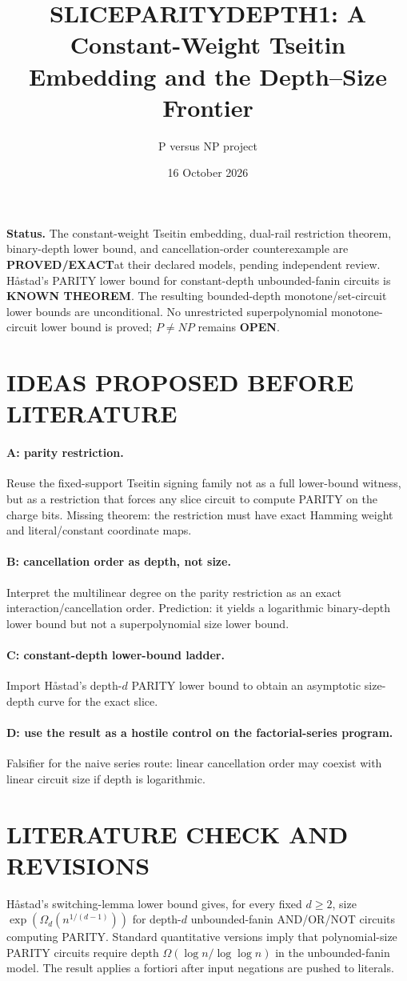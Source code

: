 \documentclass[11pt]{article}
\title{SLICEPARITYDEPTH1: A Constant-Weight Tseitin Embedding and the Depth--Size Frontier}
\author{P versus NP project}
\date{16 October 2026}
\newcommand{\EXACT}{\textbf{PROVED/EXACT}}
\newcommand{\KNOWN}{\textbf{KNOWN THEOREM}}
\newcommand{\OPEN}{\textbf{OPEN}}
\begin{document}
\maketitle

\noindent\textbf{Status.} The constant-weight Tseitin embedding, dual-rail restriction theorem, binary-depth lower bound, and cancellation-order counterexample are \EXACT at their declared models, pending independent review. H\aa stad's PARITY lower bound for constant-depth unbounded-fanin circuits is \KNOWN. The resulting bounded-depth monotone/set-circuit lower bounds are unconditional. No unrestricted superpolynomial monotone-circuit lower bound is proved; $P\ne NP$ remains \OPEN.

\section{IDEAS PROPOSED BEFORE LITERATURE}
\paragraph{A: parity restriction.} Reuse the fixed-support Tseitin signing family not as a full lower-bound witness, but as a restriction that forces any slice circuit to compute PARITY on the charge bits. Missing theorem: the restriction must have exact Hamming weight and literal/constant coordinate maps.
\paragraph{B: cancellation order as depth, not size.} Interpret the multilinear degree on the parity restriction as an exact interaction/cancellation order. Prediction: it yields a logarithmic binary-depth lower bound but not a superpolynomial size lower bound.
\paragraph{C: constant-depth lower-bound ladder.} Import H\aa stad's depth-$d$ PARITY lower bound to obtain an asymptotic size-depth curve for the exact slice.
\paragraph{D: use the result as a hostile control on the factorial-series program.} Falsifier for the naive series route: linear cancellation order may coexist with linear circuit size if depth is logarithmic.

\section{LITERATURE CHECK AND REVISIONS}
H\aa stad's switching-lemma lower bound gives, for every fixed $d\ge2$, size $\exp(\Omega_d(n^{1/(d-1)}))$ for depth-$d$ unbounded-fanin AND/OR/NOT circuits computing PARITY. Standard quantitative versions imply that polynomial-size PARITY circuits require depth $\Omega(\log n/\log\log n)$ in the unbounded-fanin model. The result applies a fortiori after input negations are pushed to literals.
\end{document}
